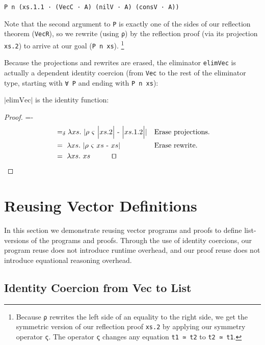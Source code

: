 \documentclass[a4paper,envcountsame,envcountsect]{llncs}
\newcommand{\eqed}[0]{\tag*{\qed}}
\newcommand{\labsec}[1]{\label{sec:#1}}
\newcommand{\lablem}[1]{\label{lem:#1}}
\newcommand{\nega}[0]{\ensuremath{{\text -}}}
\newcommand{\earg}[1]{\,\,#1}
\newcommand{\erase}[1]{\ensuremath{\lvert #1 \rvert}}
\newcommand{\Erase}[1]{\ensuremath{\Big\lvert #1 \Big\rvert}}
\newcommand{\rewrite}[2]{\ensuremath{\rho ~ #1 ~\nega~ #2}}
\newcommand{\fun}[1]{\lambda #1 .~}
\newcommand{\by}[1]{\text{#1}}
\newcommand{\name}[1]{\textrm{#1}}
\begin{document}
\begin{verbatim}
P n (xs.1.1 · (VecC · A) (nilV · A) (consV · A))
\end{verbatim}

Note that the second argument to \texttt{P} is exactly one of the
sides of our reflection theorem (\texttt{VecR}), so we rewrite
(using \texttt{ρ}) by the
reflection proof (via its projection \texttt{xs.2}) to arrive at our
goal (\texttt{P n xs}). \footnote{Because \texttt{ρ} rewrites the left
  side of an equality to the right side, we get the symmetric version
  of our reflection proof \texttt{xs.2} by applying our symmetry
  operator \texttt{ς}. The operator \texttt{ς} changes any equation
  \texttt{t1 ≃ t2} to \texttt{t2 ≃ t1}.
  }

Because the projections and rewrites are erased, the eliminator
\texttt{elimVec} is actually a dependent identity coercion
(from \texttt{Vec} to the rest of the eliminator type, starting
with \texttt{∀ P} and ending with \texttt{P n xs}):

\begin{lemma}
\erase{\name{elimVec}} is the identity function:
\lablem{elimvec}
\end{lemma}

\begin{proof}
{\small
\abovedisplayskip=-\baselineskip
\begin{align*}
  &=_\delta \fun{xs} \erase{
    \rewrite{
      \varsigma \earg \Erase{xs.2}
    }{
      \Erase{xs.1.2}
    }
  }
  && \by{Erase projections.}
  \\
  &=~ \fun{xs} \erase{
    \rewrite{
      \varsigma \earg xs
    }{
      xs
    }
  }
  && \by{Erase rewrite.}
  \\
  &=~ \fun{xs}{xs}
  \eqed
\end{align*}}
\end{proof}


\section{Reusing Vector Definitions}
\labsec{vecreuse}

In this section we demonstrate reusing vector programs and proofs to
define list-versions of the programs and proofs. Through the use of
identity coercions, our program reuse does not introduce runtime overhead,
and our proof reuse does not introduce equational reasoning overhead.

\subsection{Identity Coercion from Vec to List}
\labsec{vecreuse:v2l}
\end{document}
